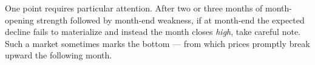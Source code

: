 \documentclass[10pt, openany]{book}
\begin{document}
One point requires particular attention. After two or three months of
month-opening strength followed by month-end weakness, if at month-end
the expected decline fails to materialize and instead the month closes
\textit{high}, take careful note. Such a market sometimes marks the
bottom --- from which prices promptly break upward the following month.












\end{document}
